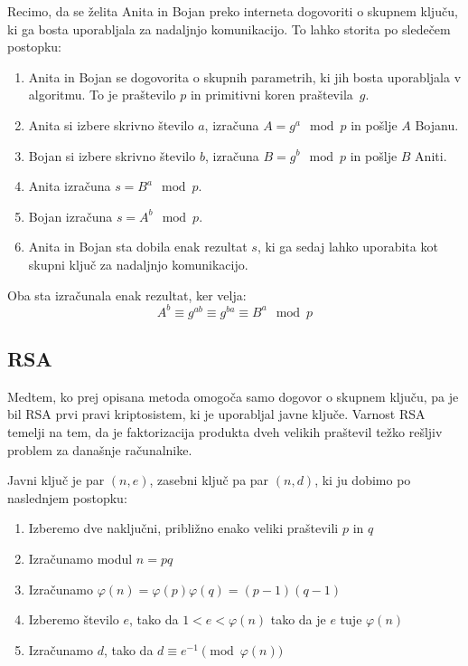 \documentclass[12pt,a4paper,openany,tikz]{book}
\theoremstyle{plain}
\theoremstyle{definition}
\begin{document}
Recimo, da se želita Anita in Bojan preko interneta dogovoriti o skupnem ključu, ki ga bosta uporabljala za nadaljnjo komunikacijo. To lahko storita po sledečem postopku:

\begin{mdframed}[frametitle={Izmenjava ključa Diffe-Hellman}]
\begin{enumerate}
	\item Anita in Bojan se dogovorita o skupnih parametrih, ki jih bosta uporabljala v algoritmu. To je praštevilo $p$ in primitivni koren praštevila~$g$.
	\item Anita si izbere skrivno število $a$, izračuna $A=g^a \mod p$ in pošlje $A$ Bojanu.
	\item Bojan si izbere skrivno število $b$, izračuna $B=g^b \mod p$ in pošlje $B$ Aniti.
	\item Anita izračuna $s=B^a \mod p$.
	\item Bojan izračuna $s=A^b \mod p$.
	\item Anita in Bojan sta dobila enak rezultat $s$, ki ga sedaj lahko uporabita kot skupni ključ za nadaljnjo komunikacijo.
\end{enumerate}

\vspace{0.5cm}

Oba sta izračunala enak rezultat, ker velja:
$$
A^b \equiv g^{ab} \equiv g^{ba} \equiv B^a \mod p
$$

\end{mdframed}


\subsection{RSA}
\label{sub:RSA}

Medtem, ko prej opisana metoda omogoča samo dogovor o skupnem ključu, pa je bil \gls{RSA} prvi pravi kriptosistem, ki je uporabljal javne ključe. Varnost \gls{RSA} temelji na tem, da je faktorizacija produkta dveh velikih praštevil težko rešljiv problem za današnje računalnike.

Javni ključ je par $(n, e)$, zasebni ključ pa par $(n, d)$, ki ju dobimo po naslednjem postopku:

\begin{enumerate}
\item Izberemo dve naključni, približno enako veliki praštevili $p$ in $q$
\item Izračunamo modul $n=pq$
\item Izračunamo $\varphi(n)=\varphi(p)\varphi(q)=(p-1)(q-1)$
\item Izberemo število $e$, tako da $1<e<\varphi(n)$ tako da je $e$ tuje $\varphi(n)$
\item Izračunamo $d$, tako da $d \equiv e^{-1} \pmod{\varphi(n)}$
\end{enumerate}
\end{document}
